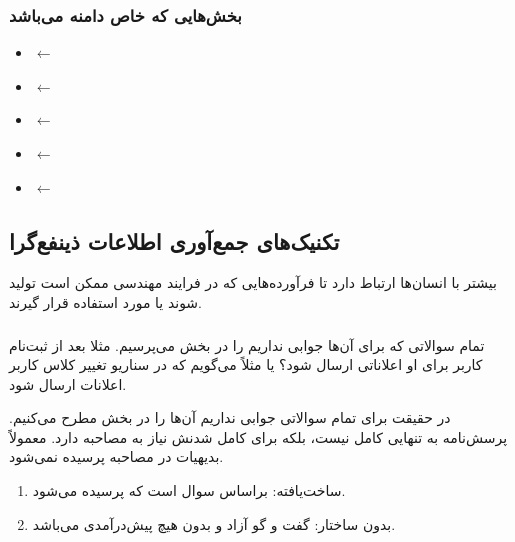 \subsubsection*{بخش‌هایی که خاص دامنه می‌باشد}

\begin{itemize}
    \item {} $\leftarrow$ 
    \item {} $\leftarrow$ 
    \item {} $\leftarrow$ 
    \item {} $\leftarrow$ 
    \item {} $\leftarrow$ 
\end{itemize}

\newpage

\subsection{تکنیک‌های جمع‌آوری اطلاعات ذینفع‌گرا}

بیشتر با انسان‌ها ارتباط دارد تا فرآورده‌هایی که در فرایند مهندسی ممکن است تولید
شوند یا مورد استفاده قرار گیرند.

\subsubsection{}

تمام سوالاتی که برای آن‌ها جوابی نداریم را در بخش  می‌پرسیم. مثلا
بعد از ثبت‌نام کاربر برای او اعلاناتی ارسال شود؟ یا مثلاً می‌گویم که در سناریو
تغییر کلاس کاربر اعلانات ارسال شود.

در حقیقت برای تمام سوالاتی جوابی نداریم آن‌ها را در بخش  مطرح
می‌کنیم. پرسش‌نامه به تنهایی کامل نیست، بلکه برای کامل شدنش نیاز به مصاحبه دارد.
معمولاً بدیهیات در مصاحبه پرسیده نمی‌شود.

\begin{enumerate}
    \item ساخت‌یافته: براساس سوال است که پرسیده می‌شود.
    \item بدون ساختار: گفت و گو آزاد و بدون هیچ پیش‌درآمدی می‌باشد.
\end{enumerate}

\subsubsection{}

